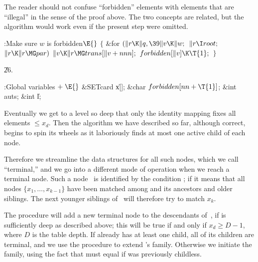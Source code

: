 The reader should not confuse ``forbidden'' elements with elements that are
``illegal'' in the sense of the proof above. The two concepts are related,
but the algorithm would work even if the present step were omitted.

\Y\B\4:Make sure $w$ is forbidden\X${}\E{}$\6
${}\{{}$\1\6
\&{for} ${}(\|r\K\|q,\39\|v\K\|w;{}$ ${}\|r\I\\{root};{}$ ${}\|r\K\|r\MG%
\\{par}){}$\1\5
${}\|v\K\|r\MG\\{trans}[\|v+\\{nnn}];{}$\2\6
${}\\{forbidden}[\|v]\K\T{1};{}$\6
\4${}\}{}$\2\par
\U26.\fi

\B{}:Global variables\X${}\mathrel+\E{}$\6
\&{SETcard} \|x[];\6
\&{char} ${}\\{forbidden}[\\{nn}+\T{1}]{}$;\6
\&{int} \\{auts};\6
\&{int} \|l;\par
\fi

Eventually we get to a level so deep that only the
identity mapping fixes
all elements $\le x_d$. Then the algorithm we have described so far,
although correct, begins to spin its wheels as it laboriously finds at
most one active child of each node.

Therefore we streamline the data structures for all such nodes, which we
call ``terminal,'' and we go into a different mode of operation when we
reach a terminal node. Such a node~ is identified by the condition
;
if  it means that all nodes $\{x_1,\ldots,x_{k-1}\}$
have
been matched among  and its ancestors and older siblings. The next
younger siblings of~ will therefore try to match $x_k$.

The  procedure will add a new terminal node to the descendants
of~, if  is sufficiently deep as described above; this will be
true
if and only if $x_d\ge D-1$, where $D$ is the  table depth.
If  already has at least one child, all of its children are terminal,
and we use the  procedure to extend 's
family.
Otherwise we initiate the family, using the fact that  must equal 
if  was previously childless.

